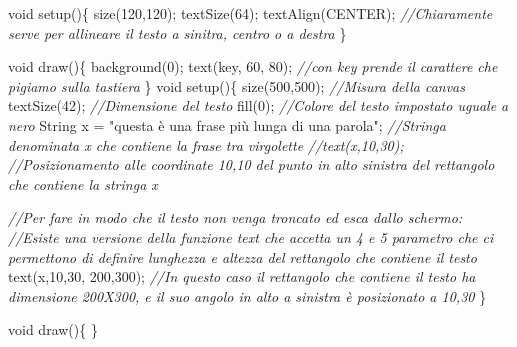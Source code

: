 \documentclass[
]{article}
\newenvironment{Shaded}{}{}
\newcommand{\BuiltInTok}[1]{\textcolor[rgb]{0.00,0.50,0.00}{#1}}
\newcommand{\CommentTok}[1]{\textcolor[rgb]{0.38,0.63,0.69}{\textit{#1}}}
\newcommand{\DataTypeTok}[1]{\textcolor[rgb]{0.56,0.13,0.00}{#1}}
\newcommand{\DecValTok}[1]{\textcolor[rgb]{0.25,0.63,0.44}{#1}}
\newcommand{\FunctionTok}[1]{\textcolor[rgb]{0.02,0.16,0.49}{#1}}
\newcommand{\NormalTok}[1]{#1}
\newcommand{\OperatorTok}[1]{\textcolor[rgb]{0.40,0.40,0.40}{#1}}
\newcommand{\StringTok}[1]{\textcolor[rgb]{0.25,0.44,0.63}{#1}}
\begin{document}
\begin{Shaded}
\begin{Highlighting}[]
\DataTypeTok{void} \FunctionTok{setup}\OperatorTok{()\{}
  \FunctionTok{size}\OperatorTok{(}\DecValTok{120}\OperatorTok{,}\DecValTok{120}\OperatorTok{);}
  \FunctionTok{textSize}\OperatorTok{(}\DecValTok{64}\OperatorTok{);}
  \FunctionTok{textAlign}\OperatorTok{(}\NormalTok{CENTER}\OperatorTok{);} \CommentTok{//Chiaramente serve per allineare il testo a sinitra, centro o a destra}
\OperatorTok{\}}

\DataTypeTok{void} \FunctionTok{draw}\OperatorTok{()\{}
  \FunctionTok{background}\OperatorTok{(}\DecValTok{0}\OperatorTok{);}
  \FunctionTok{text}\OperatorTok{(}\NormalTok{key}\OperatorTok{,} \DecValTok{60}\OperatorTok{,} \DecValTok{80}\OperatorTok{);} \CommentTok{//con key prende il carattere che pigiamo sulla tastiera}
\OperatorTok{\}}
\DataTypeTok{void} \FunctionTok{setup}\OperatorTok{()\{}
  \FunctionTok{size}\OperatorTok{(}\DecValTok{500}\OperatorTok{,}\DecValTok{500}\OperatorTok{);} \CommentTok{//Misura della canvas                                            }
  \FunctionTok{textSize}\OperatorTok{(}\DecValTok{42}\OperatorTok{);}  \CommentTok{//Dimensione del testo}
  \FunctionTok{fill}\OperatorTok{(}\DecValTok{0}\OperatorTok{);}       \CommentTok{//Colore del testo impostato uguale a nero}
  \BuiltInTok{String}\NormalTok{ x }\OperatorTok{=} \StringTok{"questa è una frase più lunga di una parola"}\OperatorTok{;}  \CommentTok{//Stringa denominata x che contiene la frase tra virgolette}
  \CommentTok{//text(x,10,30);  //Posizionamento alle coordinate 10,10 del punto in alto sinistra del rettangolo che contiene la stringa x}

  \CommentTok{//Per fare in modo che il testo non venga troncato ed esca dallo schermo:}
  \CommentTok{//Esiste una versione della funzione text che accetta un 4 e 5 parametro che ci permettono di definire lunghezza e altezza del rettangolo che contiene il testo}
  \FunctionTok{text}\OperatorTok{(}\NormalTok{x}\OperatorTok{,}\DecValTok{10}\OperatorTok{,}\DecValTok{30}\OperatorTok{,} \DecValTok{200}\OperatorTok{,}\DecValTok{300}\OperatorTok{);} \CommentTok{//In questo caso il rettangolo che contiene il testo ha dimensione 200X300, e il suo angolo in alto a sinistra è posizionato a 10,30}
\OperatorTok{\}}

\DataTypeTok{void} \FunctionTok{draw}\OperatorTok{()\{}
\OperatorTok{\}}
\end{Highlighting}
\end{Shaded}
\end{document}
